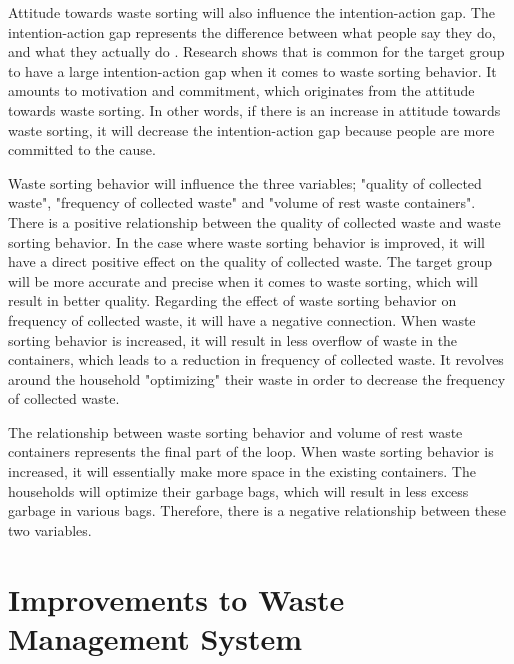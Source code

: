 \indent \newline
Attitude towards waste sorting will also influence the intention-action gap. The intention-action gap represents the difference between what people say they do, and what they actually do \cite[p. 8]{intention}. Research shows that is common for the target group to have a large intention-action gap when it comes to waste sorting behavior. It amounts to motivation and commitment, which originates from the attitude towards waste sorting. In other words, if there is an increase in attitude towards waste sorting, it will decrease the intention-action gap because people are more committed to the cause. 

\indent \newline
Waste sorting behavior will influence the three variables; "quality of collected waste", "frequency of collected waste" and "volume of rest waste containers". There is a positive relationship between the quality of collected waste and waste sorting behavior. In the case where waste sorting behavior is improved, it will have a direct positive effect on the quality of collected waste. The target group will be more accurate and precise when it comes to waste sorting, which will result in better quality. Regarding the effect of waste sorting behavior on frequency of collected waste, it will have a negative connection. When waste sorting behavior is increased, it will result in less overflow of waste in the containers, which leads to a reduction in frequency of collected waste. It revolves around the household "optimizing" their waste in order to decrease the frequency of collected waste. 

\indent \newline
The relationship between waste sorting behavior and volume of rest waste containers represents the final part of the loop. When waste sorting behavior is increased, it will essentially make more space in the existing containers. The households will optimize their garbage bags, which will result in less excess garbage in various bags.  Therefore, there is a negative relationship between these two variables. 

\section{Improvements to Waste Management System}

